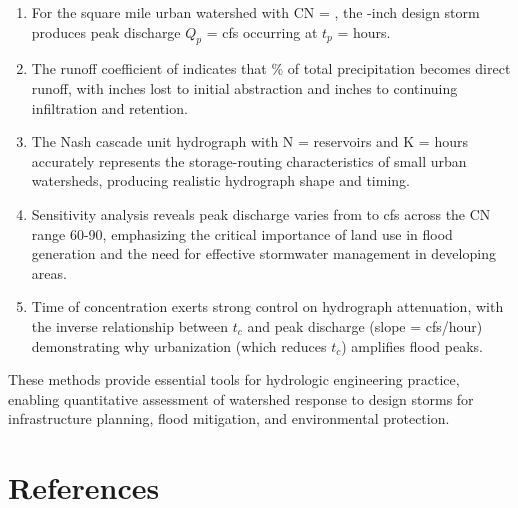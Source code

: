 \documentclass[a4paper, 11pt]{article}
\begin{document}
\begin{enumerate}
\item For the  square mile urban watershed with CN = ,
the -inch design storm produces peak discharge $Q_p$ = 
cfs occurring at $t_p$ =  hours.

\item The runoff coefficient of  indicates that
\% of total precipitation becomes direct runoff, with
 inches lost to initial abstraction and 
inches to continuing infiltration and retention.

\item The Nash cascade unit hydrograph with N =  reservoirs and K =
 hours accurately represents the storage-routing characteristics
of small urban watersheds, producing realistic hydrograph shape and timing.

\item Sensitivity analysis reveals peak discharge varies from 
to  cfs across the CN range 60-90, emphasizing the
critical importance of land use in flood generation and the need for effective stormwater
management in developing areas.

\item Time of concentration exerts strong control on hydrograph attenuation, with the
inverse relationship between $t_c$ and peak discharge (slope = 
cfs/hour) demonstrating why urbanization (which reduces $t_c$) amplifies flood peaks.
\end{enumerate}

These methods provide essential tools for hydrologic engineering practice, enabling
quantitative assessment of watershed response to design storms for infrastructure planning,
flood mitigation, and environmental protection.

\section*{References}
\end{document}

